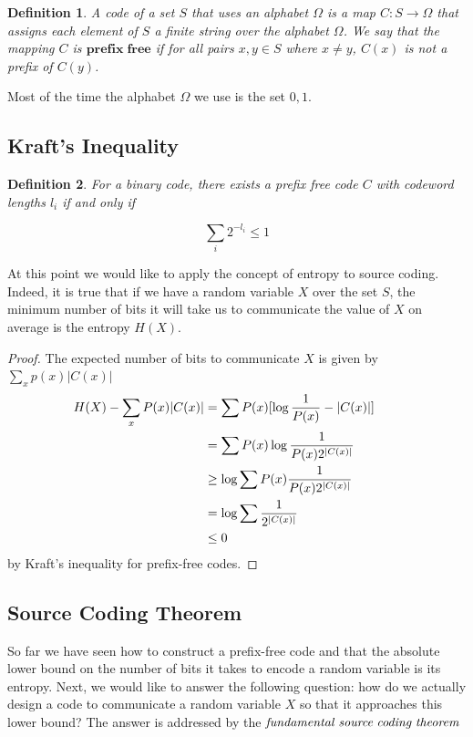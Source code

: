 \documentclass[a4paper,11pt]{book}
\newtheorem{definition}{Definition}
\begin{document}
\begin{definition}
A code of a set $S$ that uses an alphabet $\Omega$ is a map $C: S\rightarrow \Omega$ that assigns each element of $S$ a finite string over the alphabet $\Omega$. We say that the mapping $C$ is $\mathbf{prefix \; free}$ if for all pairs $x,y \in S$ where $x \neq y$, $C(x)$ is not a prefix of $C(y)$.
\end{definition}

Most of the time the alphabet $\Omega$ we use is the set $0,1$.

\subsection{Kraft's Inequality}

\begin{definition}
For a binary code, there exists a prefix free code $C$ with codeword lengths $l_{i}$ if and only if
\end{definition}

\begin{equation}
\sum_{i} 2^{-l_{i}} \leq 1
\end{equation}

At this point we would like to apply the concept of entropy to source coding. Indeed, it is true that if we have a random variable $X$ over the set $S$, the minimum number of bits it will take us to communicate the value of $X$ on average is the entropy $H(X)$.

\begin{proof}
  The expected number of bits to communicate $X$ is given by $\sum_{x}p(x)|C(x)|$
  \begin{align*}
    H(X) - \sum_{x}P(x)|C(x)| &= \sum P(x)[\log\frac{1}{P(x)} - |C(x)|] \\
    &= \sum P(x)\log\frac{1}{P(x)2^{|C(x)|}} \\
    &\geq \log\sum P(x)\frac{1}{P(x)2^{|C(x)|}}  \\
    &= \log\sum \frac{1}{2^{|C(x)|}}  \\
    &\leq 0 &&\qedhere
  \end{align*}
  by Kraft's inequality for prefix-free codes.
\end{proof}

\subsection{Source Coding Theorem}

So far we have seen how to construct a prefix-free code and that the absolute lower bound on the number of bits it takes to encode a random variable is its entropy. Next, we would like to answer the following question: how do we actually design a code to communicate a random variable $X$ so that it approaches this lower bound?  The answer is addressed by the $\it{fundamental \; source \; coding \; theorem}$ 
\end{document}
